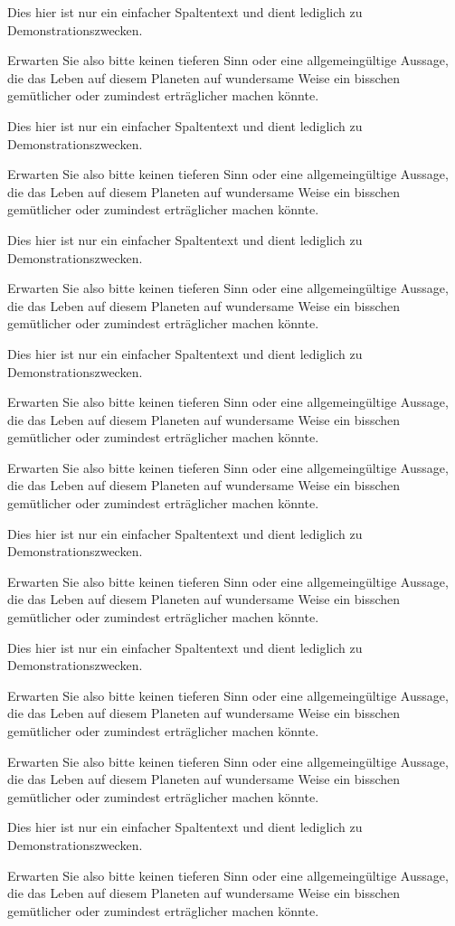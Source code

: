 \documentclass[a4paper,portrait]{scrreprt}
\begin{document}
\begin{multicols}{3}
  Dies hier ist nur ein einfacher Spaltentext und dient lediglich zu Demonstrationszwecken.
  
  Erwarten Sie also bitte keinen tieferen Sinn oder eine allgemeingültige Aussage, die das Leben auf diesem Planeten auf wundersame Weise ein bisschen gemütlicher oder zumindest erträglicher machen könnte.
  
   Dies hier ist nur ein einfacher Spaltentext und dient lediglich zu Demonstrationszwecken.
  
  Erwarten Sie also bitte keinen tieferen Sinn oder eine allgemeingültige Aussage, die das Leben auf diesem Planeten auf wundersame Weise ein bisschen gemütlicher oder zumindest erträglicher machen könnte.
  
   Dies hier ist nur ein einfacher Spaltentext und dient lediglich zu Demonstrationszwecken.
  
  Erwarten Sie also bitte keinen tieferen Sinn oder eine allgemeingültige Aussage, die das Leben auf diesem Planeten auf wundersame Weise ein bisschen gemütlicher oder zumindest erträglicher machen könnte.
  
   Dies hier ist nur ein einfacher Spaltentext und dient lediglich zu Demonstrationszwecken.
  
  Erwarten Sie also bitte keinen tieferen Sinn oder eine allgemeingültige Aussage, die das Leben auf diesem Planeten auf wundersame Weise ein bisschen gemütlicher oder zumindest erträglicher machen könnte.
  
    Erwarten Sie also bitte keinen tieferen Sinn oder eine allgemeingültige Aussage, die das Leben auf diesem Planeten auf wundersame Weise ein bisschen gemütlicher oder zumindest erträglicher machen könnte.
  
   Dies hier ist nur ein einfacher Spaltentext und dient lediglich zu Demonstrationszwecken.
  
  Erwarten Sie also bitte keinen tieferen Sinn oder eine allgemeingültige Aussage, die das Leben auf diesem Planeten auf wundersame Weise ein bisschen gemütlicher oder zumindest erträglicher machen könnte.

   Dies hier ist nur ein einfacher Spaltentext und dient lediglich zu Demonstrationszwecken.
  
  Erwarten Sie also bitte keinen tieferen Sinn oder eine allgemeingültige Aussage, die das Leben auf diesem Planeten auf wundersame Weise ein bisschen gemütlicher oder zumindest erträglicher machen könnte.
  
    Erwarten Sie also bitte keinen tieferen Sinn oder eine allgemeingültige Aussage, die das Leben auf diesem Planeten auf wundersame Weise ein bisschen gemütlicher oder zumindest erträglicher machen könnte.
  
   Dies hier ist nur ein einfacher Spaltentext und dient lediglich zu Demonstrationszwecken.
  
  Erwarten Sie also bitte keinen tieferen Sinn oder eine allgemeingültige Aussage, die das Leben auf diesem Planeten auf wundersame Weise ein bisschen gemütlicher oder zumindest erträglicher machen könnte.
 
\end{multicols}
\end{document}
